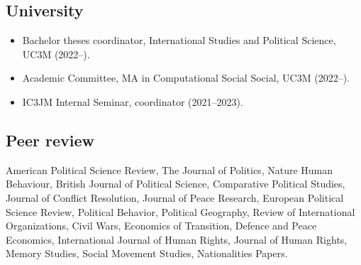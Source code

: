 \documentclass[a4paper, 12pt]{article}
\begin{document}
\subsection*{University}

\begin{itemize}[leftmargin=12pt, itemsep=0pt]
  \item Bachelor theses coordinator, International Studies and Political Science, UC3M (2022--).
	\item Academic Committee, MA in Computational Social Social, UC3M (2022--).
	\item IC3JM Internal Seminar, coordinator (2021--2023).
\end{itemize}

\subsection*{Peer review}

American Political Science Review, The Journal of Politics, Nature Human Behaviour, British Journal of Political Science, Comparative Political Studies, Journal of Conflict Resolution, Journal of Peace Research, European Political Science Review, Political Behavior, Political Geography, Review of International Organizations, Civil Wars, Economics of Transition, Defence and Peace Economics, International Journal of Human Rights, Journal of Human Rights, Memory Studies, Social Movement Studies, Nationalities Papers.


%
\end{document}
